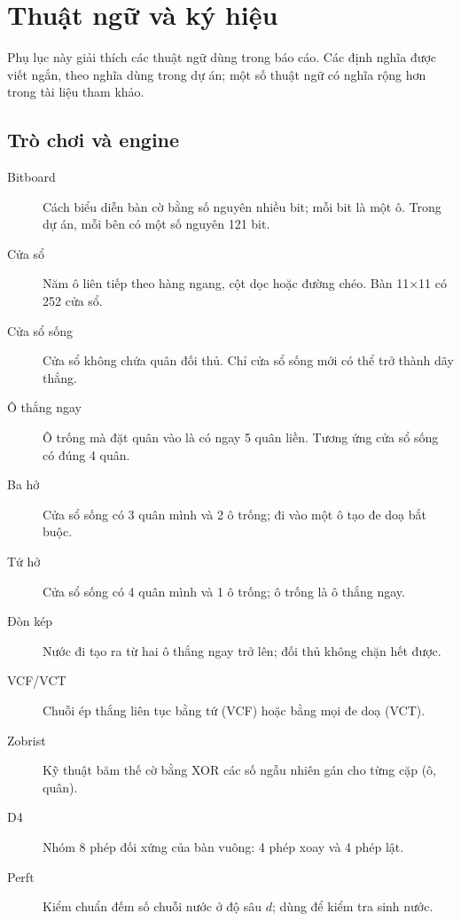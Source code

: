 \chapter{Thuật ngữ và ký hiệu}
\label{app:thuat-ngu}

Phụ lục này giải thích các thuật ngữ dùng trong báo cáo. Các định nghĩa được viết ngắn, theo
nghĩa dùng trong dự án; một số thuật ngữ có nghĩa rộng hơn trong tài liệu tham khảo.

\section{Trò chơi và engine}
\begin{description}
  \item[Bitboard] Cách biểu diễn bàn cờ bằng số nguyên nhiều bit; mỗi bit là một ô. Trong dự án,
        mỗi bên có một số nguyên 121 bit.
  \item[Cửa sổ] Năm ô liên tiếp theo hàng ngang, cột dọc hoặc đường chéo. Bàn 11×11 có 252 cửa
        sổ.
  \item[Cửa sổ sống] Cửa sổ không chứa quân đối thủ. Chỉ cửa sổ sống mới có thể trở thành dãy
        thắng.
  \item[Ô thắng ngay] Ô trống mà đặt quân vào là có ngay 5 quân liền. Tương ứng cửa sổ sống có
        đúng 4 quân.
  \item[Ba hở] Cửa sổ sống có 3 quân mình và 2 ô trống; đi vào một ô tạo đe doạ bắt buộc.
  \item[Tứ hở] Cửa sổ sống có 4 quân mình và 1 ô trống; ô trống là ô thắng ngay.
  \item[Đòn kép] Nước đi tạo ra từ hai ô thắng ngay trở lên; đối thủ không chặn hết được.
  \item[VCF/VCT] Chuỗi ép thắng liên tục bằng tứ (VCF) hoặc bằng mọi đe doạ (VCT).
  \item[Zobrist] Kỹ thuật băm thế cờ bằng XOR các số ngẫu nhiên gán cho từng cặp (ô, quân).
  \item[D4] Nhóm 8 phép đối xứng của bàn vuông: 4 phép xoay và 4 phép lật.
  \item[Perft] Kiểm chuẩn đếm số chuỗi nước ở độ sâu $d$; dùng để kiểm tra sinh nước.
\end{description}

